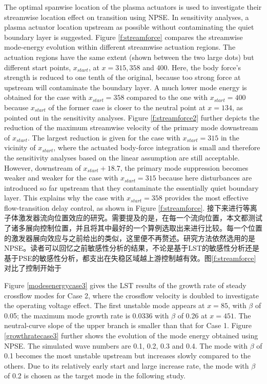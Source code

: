 The optimal spanwise location of the plasma actuators is used to investigate their streamwise location effect on transition using NPSE. In sensitivity analyses, a plasma actuator location upstream as possible without contaminating the quiet boundary layer is suggested. Figure \ref{f:streamforce} compares the streamwise mode-energy evolution within different streamwise actuation regions. The actuation regions have the same extent (shown between the two large dots) but different start points, $x_{start}$, at $x=315, 358$ and 400. Here, the body force's strength is reduced to one tenth of the original, because too strong force at upstream will contaminate the boundary layer. A much lower mode energy is obtained for the case with $x_{start}=358$ compared to the one with $x_{start}=400$ because $x_{start}$ of the former case is closer to the neutral point at $x=134$, as pointed out in the sensitivity analyses. Figure \ref{f:streamforce2} further depicts the reduction of the maximum streamwise velocity of the primary mode downstream of $x_{start}$. The largest reduction is given for the case with $x_{start}=315$ in the vicinity of $x_{start}$, where the actuated body-force integration is small and therefore the sensitivity analyses based on the linear assumption are still acceptable. However, downstream of $x_{start}+18.7$, the primary mode suppression becomes weaker and weaker for the case with $x_{start}=315$ because here disturbances are introduced so far upstream that they contaminate the essentially quiet boundary layer. This explains why the case with $x_{start}=358$ provides the most effective flow-transition delay control, as shown in Figure \ref{f:streamforce}.
接下来进行等离子体激发器流向位置效应的研究。需要提及的是，在每一个流向位置，本文都测试了诸多展向控制位置，并且将其中最好的一个算例选取出来进行比较。每一个位置的激发器展向效应与之前给出的类似，这里便不再赘述。研究方法依然选用的是NPSE。读者可以回忆之前敏感性分析的结果，不论是基于LST的敏感性分析还是基于PSE的敏感性分析，都支出在失稳区域越上游控制越有效。图\ref{f:streamforce}对比了控制开始于

Figure \ref{modesenergycase3} gives the LST results of the growth rate of steady crossflow modes for Case 2, where the crossflow velocity is doubled to investigate the operating voltage effect. The first unstable mode appears at $x =85$, with $\beta$ of 0.05; the maximum mode growth rate is 0.0336 with $\beta$ of 0.26 at $x =451$. The neutral-curve slope of the upper branch is smaller than that for Case 1. Figure \ref{growthratecase3} further shows the evolution of the mode energy obtained using NPSE. The simulated wave numbers are 0.1, 0.2, 0.3 and 0.4. The mode with $\beta$ of 0.1 becomes the most unstable upstream but increases slowly compared to the others. Due to its relatively early start and large increase rate, the mode with $\beta$ of 0.2 is chosen as the target mode in the following study.

